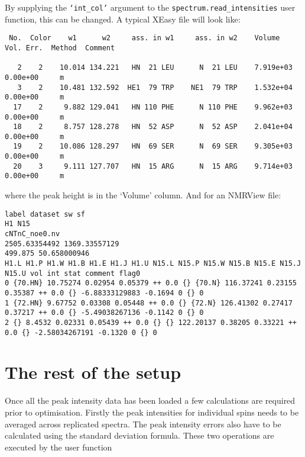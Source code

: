 By supplying the \texttt{`int\_col'} argument to the \texttt{spectrum.read\_intensities} user function, this can be changed.  A typical XEasy file will look like:

{\scriptsize \begin{verbatim}
 No.  Color    w1      w2     ass. in w1     ass. in w2    Volume     Vol. Err.  Method  Comment

   2    2    10.014 134.221   HN  21 LEU      N  21 LEU    7.919e+03  0.00e+00     m
   3    2    10.481 132.592  HE1  79 TRP    NE1  79 TRP    1.532e+04  0.00e+00     m
  17    2     9.882 129.041   HN 110 PHE      N 110 PHE    9.962e+03  0.00e+00     m
  18    2     8.757 128.278   HN  52 ASP      N  52 ASP    2.041e+04  0.00e+00     m
  19    2    10.086 128.297   HN  69 SER      N  69 SER    9.305e+03  0.00e+00     m
  20    3     9.111 127.707   HN  15 ARG      N  15 ARG    9.714e+03  0.00e+00     m
\end{verbatim}}

where the peak height is in the `Volume' column.  And for an NMRView file:

{\scriptsize \begin{verbatim}
label dataset sw sf
H1 N15
cNTnC_noe0.nv
2505.63354492 1369.33557129
499.875 50.658000946
H1.L H1.P H1.W H1.B H1.E H1.J H1.U N15.L N15.P N15.W N15.B N15.E N15.J N15.U vol int stat comment flag0
0 {70.HN} 10.75274 0.02954 0.05379 ++ 0.0 {} {70.N} 116.37241 0.23155 0.35387 ++ 0.0 {} -6.88333129883 -0.1694 0 {} 0
1 {72.HN} 9.67752 0.03308 0.05448 ++ 0.0 {} {72.N} 126.41302 0.27417 0.37217 ++ 0.0 {} -5.49038267136 -0.1142 0 {} 0
2 {} 8.4532 0.02331 0.05439 ++ 0.0 {} {} 122.20137 0.38205 0.33221 ++ 0.0 {} -2.58034267191 -0.1320 0 {} 0
\end{verbatim}}



\section{The rest of the setup}

Once all the peak intensity data has been loaded a few calculations are required prior to optimisation.  Firstly the peak intensities for individual spins needs to be averaged across replicated spectra.  The peak intensity errors also have to be calculated using the standard deviation formula.  These two operations are executed by the user function


